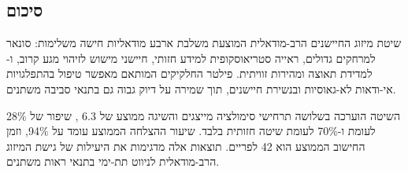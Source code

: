 \subsection{סיכום}
\label{sec:ch05_summary}

שיטת מיזוג החיישנים הרב-מודאלית המוצעת משלבת ארבע מודאליות חישה משלימות: סונאר למרחקים גדולים, ראייה סטריאוסקופית למידע חזותי, חיישני מישוש לזיהוי מגע קרוב, ו- למדידת תאוצה ומהירות זוויתית. פילטר החלקיקים המותאם מאפשר טיפול בהתפלגויות אי-ודאות לא-גאוסיות ובנשירת חיישנים, תוך שמירה על דיוק גבוה גם בתנאי סביבה משתנים.

השיטה הוערכה בשלושה תרחישי סימולציה מייצגים והשיגה  ממוצע של 6.3 , שיפור של 28\% לעומת  ו-70\% לעומת שיטה חזותית בלבד. שיעור ההצלחה הממוצע עומד על 94\%, וזמן החישוב הממוצע הוא 42  לפריים. תוצאות אלה מדגימות את היעילות של גישת המיזוג הרב-מודאלית לניווט תת-ימי בתנאי ראות משתנים.

\cite{Campos2021, Thrun2005, Shih2020, Rahman2019, Dellaert2017, Cadena2016}


